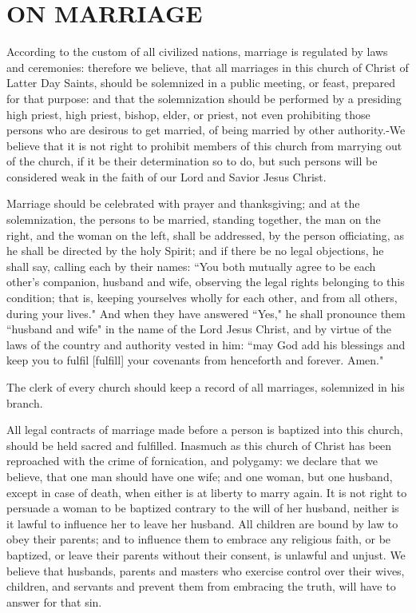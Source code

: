 \chapter{ON MARRIAGE}

According to the custom of all civilized nations, marriage is regulated by laws and
ceremonies: therefore we believe, that all marriages in this church of Christ of
Latter Day Saints, should be solemnized in a public meeting, or feast, prepared for
that purpose: and that the solemnization should be performed by a presiding high
priest, high priest, bishop, elder, or priest, not even prohibiting those persons who
are desirous to get married, of being married by other authority.-We believe that it
is not right to prohibit members of this church from marrying out of the church, if
it be their determination so to do, but such persons will be considered weak in the
faith of our Lord and Savior Jesus Christ.

Marriage should be celebrated with prayer and thanksgiving; and at the solemnization,
the persons to be married, standing together, the man on the right, and the woman on
the left, shall be addressed, by the person officiating, as he shall be directed by
the holy Spirit; and if there be no legal objections, he shall say, calling each by
their names: ``You both mutually agree to be each other's companion, husband and wife,
observing the legal rights belonging to this condition; that is, keeping yourselves
wholly for each other, and from all others, during your lives." And when they have
answered ``Yes," he shall pronounce them ``husband and wife" in the name of the Lord
Jesus Christ, and by virtue of the laws of the country and authority vested in him:
``may God add his blessings and keep you to fulfil [fulfill] your covenants from
henceforth and forever. Amen."

The clerk of every church should keep a record of all marriages, solemnized in his 
branch.

All legal contracts of marriage made before a person is baptized into this church,
should be held sacred and fulfilled. Inasmuch as this church of Christ has been
reproached with the crime of fornication, and polygamy: we declare that we believe,
that one man should have one wife; and one woman, but one husband, except in case of
death, when either is at liberty to marry again. It is not right to persuade a woman
to be baptized contrary to the will of her husband, neither is it lawful to influence
her to leave her husband. All children are bound by law to obey their parents; and to
influence them to embrace any religious faith, or be baptized, or leave their parents
without their consent, is unlawful and unjust. We believe that husbands, parents and
masters who exercise control over their wives, children, and servants and prevent
them from embracing the truth, will have to answer for that sin.

